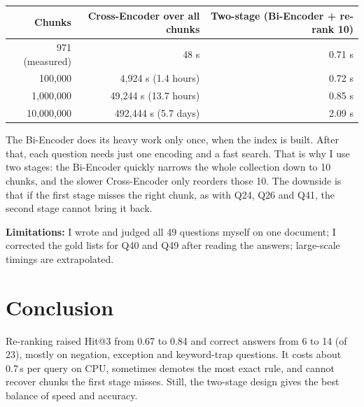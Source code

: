 \documentclass[11pt,a4paper]{article}
\begin{document}
\begin{center}
\small
\begin{tabular}{rrr}
\toprule
Chunks & Cross-Encoder over all chunks & Two-stage (Bi-Encoder + re-rank 10) \\
\midrule
971 (measured) & 48 s & 0.71 s \\
100,000 & 4,924 s (1.4 hours) & 0.72 s \\
1,000,000 & 49,244 s (13.7 hours) & 0.85 s \\
10,000,000 & 492,444 s (5.7 days) & 2.09 s \\
\bottomrule
\end{tabular}
\end{center}

\begin{center}
\end{center}

The Bi-Encoder does its heavy work only once, when the index is built. After that, each question needs just one encoding and a fast search. That is why I use two stages: the Bi-Encoder quickly narrows the whole collection down to 10 chunks, and the slower Cross-Encoder only reorders those 10. The downside is that if the first stage misses the right chunk, as with Q24, Q26 and Q41, the second stage cannot bring it back.

\textbf{Limitations:} I wrote and judged all 49 questions myself on one document; I corrected the gold lists for Q40 and Q49 after reading the answers; large-scale timings are extrapolated.

\section*{Conclusion}
Re-ranking raised Hit@3 from 0.67 to 0.84 and correct answers from 6 to 14 (of 23), mostly on negation, exception and keyword-trap questions. It costs about 0.7\,s per query on CPU, sometimes demotes the most exact rule, and cannot recover chunks the first stage misses. Still, the two-stage design gives the best balance of speed and accuracy.
\end{document}

